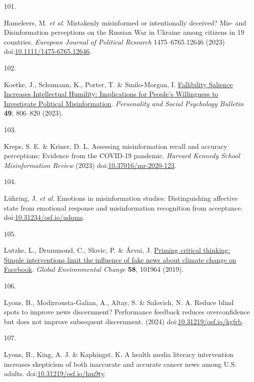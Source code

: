 \documentclass[
  man]{apa6}
\newlength{\cslhangindent}
\newlength{\csllabelwidth}
\newenvironment{CSLReferences}[2] %
 {\begin{list}{}{%
  \setlength{\itemindent}{0pt}
  \setlength{\leftmargin}{0pt}
  \setlength{\parsep}{0pt}
  \ifodd #1
   \setlength{\leftmargin}{\cslhangindent}
   \setlength{\itemindent}{-1\cslhangindent}
  \fi
  \setlength{\itemsep}{#2\baselineskip}}}
 {\end{list}}
\newcommand{\CSLLeftMargin}[1]{\parbox[t]{\csllabelwidth}{\strut#1\strut}}
\newcommand{\CSLRightInline}[1]{\parbox[t]{\linewidth - \csllabelwidth}{\strut#1\strut}}
\begin{document}
\begin{CSLReferences}{0}{0}
\CSLLeftMargin{101. }%
\CSLRightInline{*Hameleers, M. \emph{et al.} Mistakenly misinformed or intentionally deceived? Mis{-} and Disinformation perceptions on the Russian War in Ukraine among citizens in 19 countries. \emph{European Journal of Political Research} 1475--6765.12646 (2023) doi:\href{https://doi.org/10.1111/1475-6765.12646}{10.1111/1475-6765.12646}.}

\CSLLeftMargin{102. }%
\CSLRightInline{*Koetke, J., Schumann, K., Porter, T. \& Smilo-Morgan, I. \href{https://doi.org/10.1177/01461672221080979}{Fallibility Salience Increases Intellectual Humility: Implications for People{'}s Willingness to Investigate Political Misinformation}. \emph{Personality and Social Psychology Bulletin} \textbf{49}, 806--820 (2023).}

\CSLLeftMargin{103. }%
\CSLRightInline{*Kreps, S. E. \& Kriner, D. L. Assessing misinformation recall and accuracy perceptions: Evidence from the COVID-19 pandemic. \emph{Harvard Kennedy School Misinformation Review} (2023) doi:\href{https://doi.org/10.37016/mr-2020-123}{10.37016/mr-2020-123}.}

\CSLLeftMargin{104. }%
\CSLRightInline{*Lühring, J. \emph{et al.} Emotions in misinformation studies: Distinguishing affective state from emotional response and misinformation recognition from acceptance. doi:\href{https://doi.org/10.31234/osf.io/udqms}{10.31234/osf.io/udqms}.}

\CSLLeftMargin{105. }%
\CSLRightInline{*Lutzke, L., Drummond, C., Slovic, P. \& Árvai, J. \href{https://doi.org/10.1016/j.gloenvcha.2019.101964}{Priming critical thinking: Simple interventions limit the influence of fake news about climate change on Facebook}. \emph{Global Environmental Change} \textbf{58}, 101964 (2019).}

\CSLLeftMargin{106. }%
\CSLRightInline{*Lyons, B., Modirrousta-Galian, A., Altay, S. \& Salovich, N. A. Reduce blind spots to improve news discernment? Performance feedback reduces overconfidence but does not improve subsequent discernment. (2024) doi:\href{https://doi.org/10.31219/osf.io/kgfrb}{10.31219/osf.io/kgfrb}.}

\CSLLeftMargin{107. }%
\CSLRightInline{*Lyons, B., King, A. J. \& Kaphingst, K. A health media literacy intervention increases skepticism of both inaccurate and accurate cancer news among U.S. adults. doi:\href{https://doi.org/10.31219/osf.io/hm9ty}{10.31219/osf.io/hm9ty}.}


\end{CSLReferences}
\end{document}
